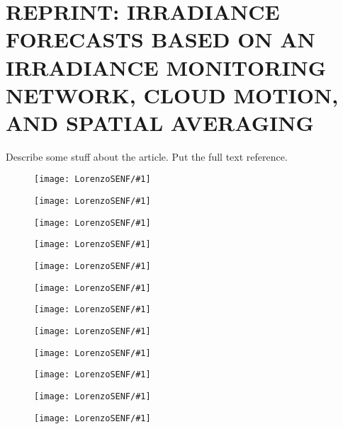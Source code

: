 \chapter{REPRINT: IRRADIANCE FORECASTS BASED ON AN IRRADIANCE MONITORING NETWORK, CLOUD MOTION, AND SPATIAL AVERAGING}
\label{networkForecastAppendix}
Describe some stuff about the article. Put the full text reference.

\newcommand{\figNF}[1]{
\begin{figure}
\texttt{[image: LorenzoSENF/\#1]}
\end{figure}
}


\figNF{pg1}
\figNF{pg2}
\figNF{pg3}
\figNF{pg4}
\figNF{pg5}
\figNF{pg6}
\figNF{pg7}
\figNF{pg8}
\figNF{pg9}
\figNF{pg10}
\figNF{pg11}
\figNF{pg12}

